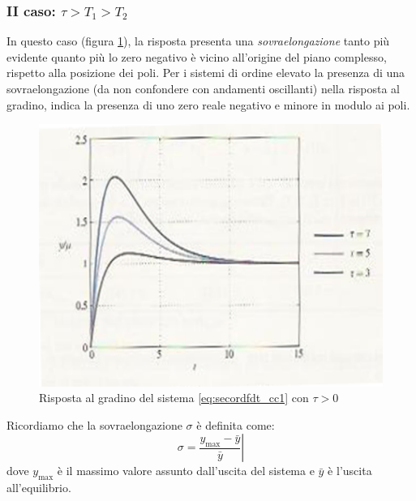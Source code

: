 \documentclass[a4paper]{report}
\begin{document}
\subsubsection{II caso: $\tau>T_1>T_2$}
In questo caso (figura \ref{fig:risp4}), la risposta presenta una
\emph{sovraelongazione} tanto pi\`u evidente quanto pi\`u lo zero negativo
\`e vicino all'origine del piano complesso, rispetto alla posizione dei
poli. Per i sistemi di ordine elevato la presenza di una
sovraelongazione (da non confondere con andamenti oscillanti) nella
risposta al gradino, indica la presenza di uno zero reale negativo e
minore in modulo ai poli.
\begin{figure}[!h]
  \begin{center}
    \includegraphics[scale=0.5]{./figures/rispscal4.png}
    \caption{Risposta al gradino del sistema \ref{eq:secordfdt_cc1} con $\tau>0$}\label{fig:risp4}
  \end{center}
\end{figure} 
Ricordiamo che la sovraelongazione $\sigma$
\`e definita come:
\begin{equation}
  \sigma  = \left . \frac{{y_{\max } - \bar y}}{{\bar y}} \right|
\end{equation}
dove $y_{\max }$ \`e il massimo valore assunto dall'uscita del sistema
e $\bar{y}$ \`e l'uscita all'equilibrio.
\end{document}
